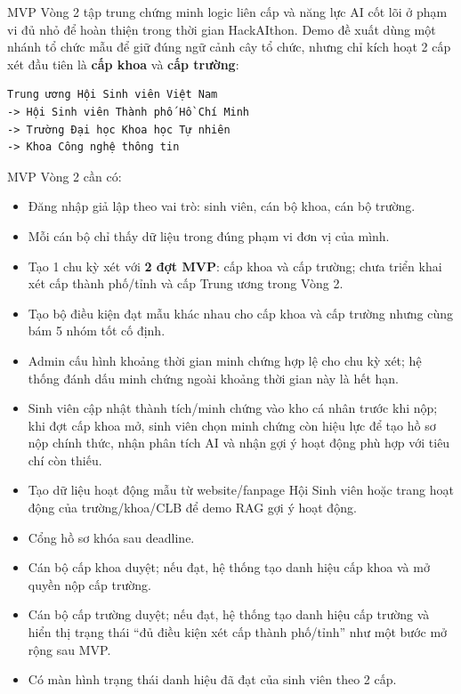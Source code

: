 MVP Vòng 2 tập trung chứng minh logic liên cấp và năng lực AI cốt lõi ở phạm vi đủ nhỏ để hoàn thiện trong thời gian HackAIthon. Demo đề xuất dùng một nhánh tổ chức mẫu để giữ đúng ngữ cảnh cây tổ chức, nhưng chỉ kích hoạt 2 cấp xét đầu tiên là \textbf{cấp khoa} và \textbf{cấp trường}:

\begin{verbatim}
Trung ương Hội Sinh viên Việt Nam
-> Hội Sinh viên Thành phố Hồ Chí Minh
-> Trường Đại học Khoa học Tự nhiên
-> Khoa Công nghệ thông tin
\end{verbatim}

\noindent MVP Vòng 2 cần có:

\begin{itemize}
    \item Đăng nhập giả lập theo vai trò: sinh viên, cán bộ khoa, cán bộ trường.
    \item Mỗi cán bộ chỉ thấy dữ liệu trong đúng phạm vi đơn vị của mình.
    \item Tạo 1 chu kỳ xét với \textbf{2 đợt MVP}: cấp khoa và cấp trường; chưa triển khai xét cấp thành phố/tỉnh và cấp Trung ương trong Vòng 2.
    \item Tạo bộ điều kiện đạt mẫu khác nhau cho cấp khoa và cấp trường nhưng cùng bám 5 nhóm tốt cố định.
    \item Admin cấu hình khoảng thời gian minh chứng hợp lệ cho chu kỳ xét; hệ thống đánh dấu minh chứng ngoài khoảng thời gian này là hết hạn.
    \item Sinh viên cập nhật thành tích/minh chứng vào kho cá nhân trước khi nộp; khi đợt cấp khoa mở, sinh viên chọn minh chứng còn hiệu lực để tạo hồ sơ nộp chính thức, nhận phân tích AI và nhận gợi ý hoạt động phù hợp với tiêu chí còn thiếu.
    \item Tạo dữ liệu hoạt động mẫu từ website/fanpage Hội Sinh viên hoặc trang hoạt động của trường/khoa/CLB để demo RAG gợi ý hoạt động.
    \item Cổng hồ sơ khóa sau deadline.
    \item Cán bộ cấp khoa duyệt; nếu đạt, hệ thống tạo danh hiệu cấp khoa và mở quyền nộp cấp trường.
    \item Cán bộ cấp trường duyệt; nếu đạt, hệ thống tạo danh hiệu cấp trường và hiển thị trạng thái ``đủ điều kiện xét cấp thành phố/tỉnh'' như một bước mở rộng sau MVP.
    \item Có màn hình trạng thái danh hiệu đã đạt của sinh viên theo 2 cấp.
\end{itemize}

